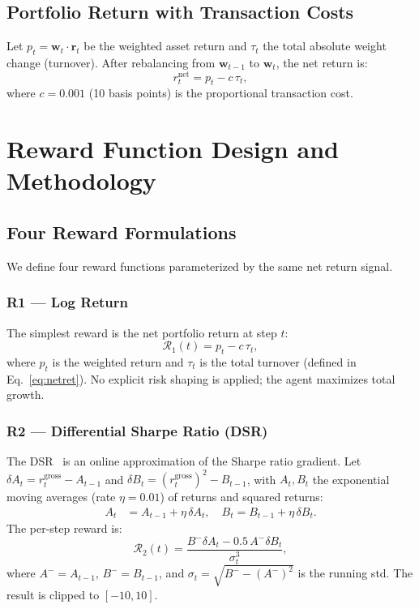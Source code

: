 \documentclass[conference]{IEEEtran}
\begin{document}
\subsection{Portfolio Return with Transaction Costs}
Let $p_t = \mathbf{w}_t \cdot \mathbf{r}_t$ be the weighted asset return
and $\tau_t$ the total absolute weight change (turnover). After rebalancing
from $\mathbf{w}_{t-1}$ to $\mathbf{w}_t$, the net return is:
\begin{equation}\label{eq:netret}
r_t^{\mathrm{net}} = p_t - c\,\tau_t,
\end{equation}
where $c = 0.001$ (10 basis points) is the proportional transaction cost.

\section{Reward Function Design and Methodology}
\label{sec:methodology}

\subsection{Four Reward Formulations}
We define four reward functions parameterized by the same net return signal.

\subsubsection{R1 --- Log Return}
The simplest reward is the net portfolio return at step $t$:
\begin{equation}
\mathcal{R}_1(t) = p_t - c\,\tau_t,
\end{equation}
where $p_t$ is the weighted return and $\tau_t$ is the total turnover
(defined in Eq.~\ref{eq:netret}).
No explicit risk shaping is applied; the agent maximizes total growth.

\subsubsection{R2 --- Differential Sharpe Ratio (DSR)}
The DSR~\cite{Moody2001} is an online approximation of the Sharpe ratio
gradient. Let $\delta A_t = r_t^{\mathrm{gross}} - A_{t-1}$ and
$\delta B_t = (r_t^{\mathrm{gross}})^2 - B_{t-1}$, with $A_t, B_t$ the
exponential moving averages (rate $\eta=0.01$) of returns and squared returns:
\begin{align}
A_t &= A_{t-1} + \eta\,\delta A_t, \quad
B_t = B_{t-1} + \eta\,\delta B_t.
\end{align}
The per-step reward is:
\begin{equation}\label{eq:dsr}
\mathcal{R}_2(t) = \frac{B^{-}\delta A_t - 0.5\,A^{-}\delta B_t}
  {\sigma_t^3},
\end{equation}
where $A^{-}=A_{t-1}$, $B^{-}=B_{t-1}$, and
$\sigma_t = \sqrt{B^{-}-(A^{-})^{2}}$ is the running std.
The result is clipped to $[-10, 10]$.
\end{document}

